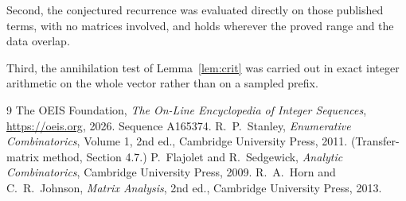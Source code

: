 \documentclass[11pt,a4paper]{article}
\theoremstyle{plain}
\theoremstyle{definition}
\begin{document}
Second, the conjectured recurrence was evaluated directly on those published terms, with no
matrices involved, and holds wherever the proved range and the data overlap.

Third, the annihilation test of Lemma~\ref{lem:crit} was carried out in exact integer
arithmetic on the whole vector rather than on a sampled prefix.

\begin{thebibliography}{9}
 The OEIS Foundation, \emph{The On-Line Encyclopedia of Integer
Sequences}, \url{https://oeis.org}, 2026. Sequence A165374.
 R.~P.~Stanley, \emph{Enumerative Combinatorics}, Volume 1, 2nd ed.,
Cambridge University Press, 2011. (Transfer-matrix method, Section 4.7.)
 P.~Flajolet and R.~Sedgewick, \emph{Analytic Combinatorics}, Cambridge
University Press, 2009.
 R.~A.~Horn and C.~R.~Johnson, \emph{Matrix Analysis}, 2nd ed., Cambridge
University Press, 2013.
\end{thebibliography}
\end{document}
